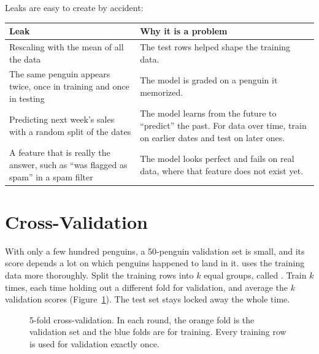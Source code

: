 Leaks are easy to create by accident:

\begin{center}
\begin{tabular}{>{\raggedright\arraybackslash}p{5.3cm} >{\raggedright\arraybackslash}p{6.2cm}}
\textbf{Leak} & \textbf{Why it is a problem} \\
\hline
Rescaling with the mean of all the data & The test rows helped shape the training data. \\
The same penguin appears twice, once in training and once in testing & The model is graded on a penguin it memorized. \\
Predicting next week's sales with a random split of the dates & The model learns from the future to ``predict'' the past. For data over time, train on earlier dates and test on later ones. \\
A feature that is really the answer, such as ``was flagged as spam'' in a spam filter & The model looks perfect and fails on real data, where that feature does not exist yet. \\
\end{tabular}
\end{center}

\section{Cross-Validation}
With only a few hundred penguins, a 50-penguin validation set is small, and its score depends a lot on which
penguins happened to land in it.  uses the training data more thoroughly.
Split the training rows into $k$ equal groups, called . Train $k$ times, each time
holding out a different fold for validation, and average the $k$ validation scores
(Figure~\ref{fig:kfold}). The test set stays locked away the whole time.

\begin{figure}[H]
\centering
{}
\caption{5-fold cross-validation. In each round, the orange fold is the validation set and the blue folds
are for training. Every training row is used for validation exactly once.}
\label{fig:kfold}
\end{figure}

